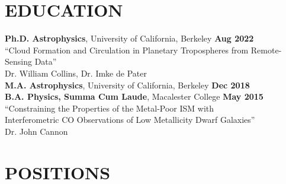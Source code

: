 \documentclass[margin, 10pt]{res} %
\newcommand\tab[1][1cm]{\hspace*{#1}}
\begin{document}
\begin{resume}
	

 

\section{EDUCATION}

{\bf Ph.D. Astrophysics}, University of California, Berkeley \hfill
{\bf Aug 2022} \\
\tab {\it Thesis:} ``Cloud Formation and Circulation in Planetary Tropospheres %
from Remote-Sensing Data'' \\
\tab {\it Advisers:} Dr. William Collins, Dr. Imke de Pater \\
{\bf M.A. Astrophysics}, University of California, Berkeley \hfill
{\bf Dec 2018} \\
{\bf B.A. Physics, Summa Cum Laude}, Macalester College \hfill {\bf
  May 2015} \\
\tab {\it Thesis:}  ``Constraining the Properties of the Metal-Poor
ISM with \\ \tab \tab \tab Interferometric CO Observations of Low Metallicity Dwarf
Galaxies'' \\
\tab {\it Adviser:} Dr. John Cannon


\section{POSITIONS}


\end{resume}
\end{document}
